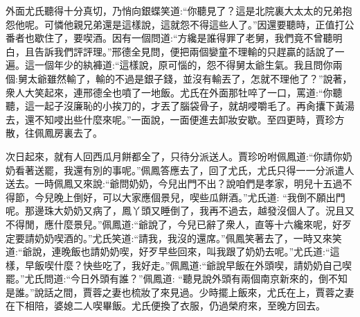 \begin{parag}
    外面尤氏聽得十分真切，乃悄向銀蝶笑道:“你聽見了？這是北院裏大太太的兄弟抱怨他呢。可憐他親兄弟還是這樣說，這就怨不得這些人了。”因還要聽時，正值打公番者也歇住了，要喫酒。因有一個問道:“方纔是誰得罪了老舅，我們竟不曾聽明白，且告訴我們評評理。”邢德全見問，便把兩個孌童不理輸的只趕贏的話說了一遍。這一個年少的紈褲道:“這樣說，原可惱的，怨不得舅太爺生氣。我且問你兩個:舅太爺雖然輸了，輸的不過是銀子錢，並沒有輸丟了，怎就不理他了？”說著，衆人大笑起來，連邢德全也噴了一地飯。尤氏在外面那牡啐了一口，罵道:“你聽聽，這一起子沒廉恥的小挨刀的，才丟了腦袋骨子，就胡唚嚼毛了。再肏攮下黃湯去，還不知唚出些什麼來呢。”一面說，一面便進去卸妝安歇。至四更時，賈珍方散，往佩鳳房裏去了。
\end{parag}


\begin{parag}
    次日起來，就有人回西瓜月餅都全了，只待分派送人。賈珍吩咐佩鳳道:“你請你奶奶看著送罷，我還有別的事呢。”佩鳳答應去了，回了尤氏，尤氏只得一一分派遣人送去。一時佩鳳又來說:“爺問奶奶，今兒出門不出？說咱們是孝家，明兒十五過不得節，今兒晚上倒好，可以大家應個景兒，喫些瓜餅酒。”尤氏道: “我倒不願出門呢。那邊珠大奶奶又病了，鳳丫頭又睡倒了，我再不過去，越發沒個人了。況且又不得閒，應什麼景兒。”佩鳳道:“爺說了，今兒已辭了衆人，直等十六纔來呢，好歹定要請奶奶喫酒的。”尤氏笑道:“請我，我沒的還席。”佩鳳笑著去了，一時又來笑道:“爺說，連晚飯也請奶奶喫，好歹早些回來，叫我跟了奶奶去呢。”尤氏道:“這樣，早飯喫什麼？快些吃了，我好走。”佩鳳道:“爺說早飯在外頭喫，請奶奶自己喫罷。”尤氏問道:“今日外頭有誰？”佩鳳道: “聽見說外頭有兩個南京新來的，倒不知是誰。”說話之間，賈蓉之妻也梳妝了來見過。少時擺上飯來，尤氏在上，賈蓉之妻在下相陪，婆媳二人喫畢飯。尤氏便換了衣服，仍過榮府來，至晚方回去。
\end{parag}


